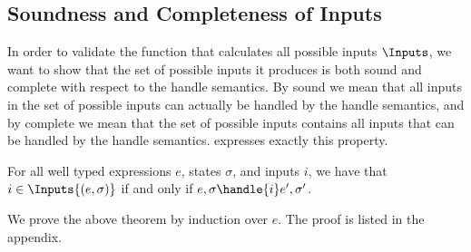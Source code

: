 \subsection{Soundness and Completeness of Inputs}

In order to validate the function that calculates all possible inputs $\Inputs$,
we want to show that the set of possible inputs it produces is both sound and complete with respect to the handle semantics.
By sound we mean that all inputs in the set of possible inputs can actually be handled by the handle semantics,
and by complete we mean that the set of possible inputs contains all inputs that can be handled by the handle semantics.
 expresses exactly this property.

\begin{theorem}
  For all well typed expressions $e$, states $\sigma$, and inputs $i$,
  we have that $i \in \Inputs{(e,\sigma)}$ if and only if $e,\sigma \handle{i} e',\sigma'$.
  \label{thm:safety-i}
\end{theorem}

We prove the above theorem by induction over $e$. The proof is listed in the
appendix.
